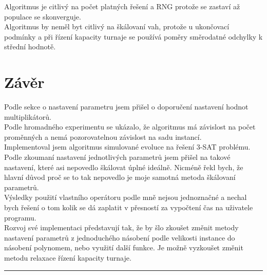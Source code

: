 \documentclass{article}
\begin{document}
Algoritmus je citlivý na počet platných řešení a RNG protože se zastaví až populace se skonverguje.\\

Algoritmus by neměl byt citlivý na škálovaní vah, protože u ukončovací podmínky a při řízení kapacity turnaje se používá poměry směrodatné odchylky k střední hodnotě.\\

\newpage
\section{Závěr}

Podle sekce o nastavení parametru jsem přišel o doporučení nastavení hodnot multiplikátorů.\\

Podle hromadného  experimentu se ukázalo, že algoritmus má závislost na počet proměnných a nemá pozorovatelnou závislost na sadu instancí.\\

Implementoval jsem algoritmus simulované evoluce na řešení 3-SAT problému. Podle zkoumaní nastavení jednotlivých parametrů jsem přišel na takové nastavení, které asi nepovedlo škálovat úplné ideálně. Nicméně řekl bych, že hlavní důvod proč se to tak nepovedlo je moje samotná metoda škálovaní parametrů.\\

Výsledky použití vlastního operátoru podle mně nejsou jednoznačné a nechal bych řešení o tom kolik se dá zaplatit v přesností za vypočtení čas na uživatele programu.\\

Rozvoj své implementaci představují tak, že by šlo zkoušet změnit metody nastavení parametrů z jednoduchého násobení podle velikosti instance do násobení polynomem, nebo využití další funkce. Je možně vyzkoušet změnit metodu relaxace řízení kapacity turnaje.

\noindent\rule{12cm}{0.4pt}\\

\nocite{*}

\end{document}
